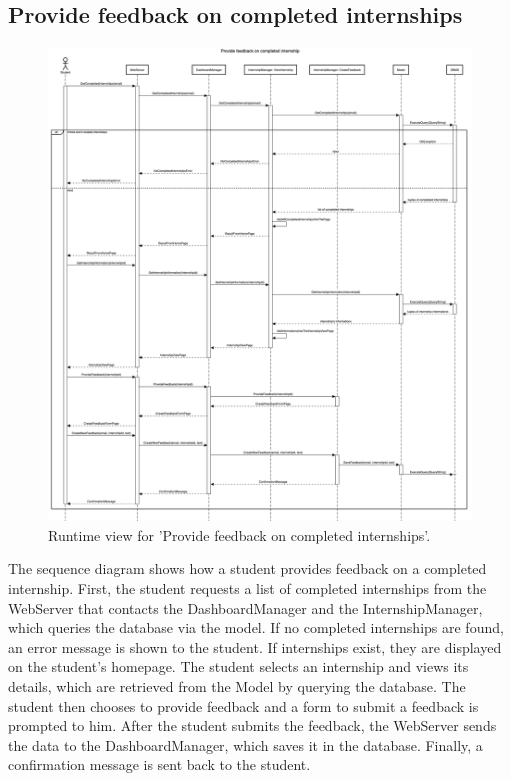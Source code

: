 \subsection{Provide feedback on completed internships}
\begin{figure}[H]
    \begin{center}
        \includegraphics[width=0.8\linewidth]{DD/LaTeX/Images/RuntimeView/ProvideFeedbackOnCompletedInternships.png}
        \caption{Runtime view for 'Provide feedback on completed internships'.}
        \label{fig:runtime_ProvideFeedbackOnCompletedInternships}%
    \end{center}
\end{figure}

The sequence diagram shows how a student provides feedback on a completed internship. First, the student requests a list of completed internships from the WebServer that contacts the DashboardManager and the InternshipManager, which queries the database via the model. If no completed internships are found, an error message is shown to the student. If internships exist, they are displayed on the student's homepage. The student selects an internship and views its details, which are retrieved from the Model by querying the database. The student then chooses to provide feedback and a form to submit a feedback is prompted to him. After the student submits the feedback, the WebServer sends the data to the DashboardManager, which saves it in the database. Finally, a confirmation message is sent back to the student.

